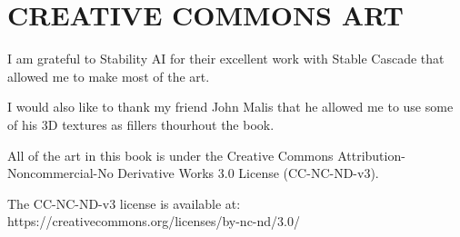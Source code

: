 \onecolumn
\chapter{CREATIVE COMMONS ART}


\noindent I am grateful to Stability AI for their excellent work with Stable Cascade that allowed me to make most of the art.

\vspace{1em}

\noindent I would also like to thank my friend John Malis that he allowed me to use some of his 3D textures as fillers thourhout the book.

\vspace{1em}

\noindent All of the art in this book is under the Creative Commons Attribution-Noncommercial-No Derivative Works 3.0 License (CC-NC-ND-v3).

\vspace{1em}

\noindent The CC-NC-ND-v3 license is available at: https://creativecommons.org/licenses/by-nc-nd/3.0/
